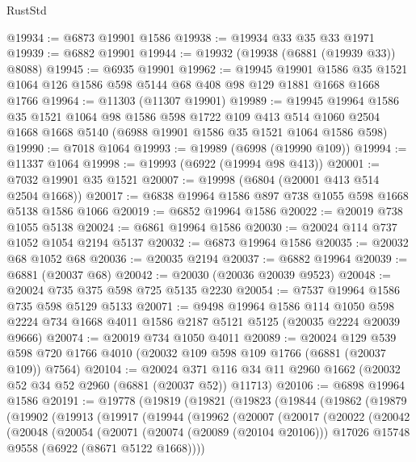 \begin{lexlean}{RustStd}
\begin{coremodule}
@19934 := @6873 @19901 @1586
@19938 := @19934 @33 @35 @33 @1971
@19939 := @6882 @19901
@19944 := @19932 (@19938 (@6881 (@19939 @33)) @8088)
@19945 := @6935 @19901
@19962 := @19945
    @19901
    @1586
    @35
    @1521
    @1064
    @126
    @1586
    @598
    @5144
    @68
    @408
    @98
    @129
    @1881
    @1668
    @1668
    @1766
@19964 := @11303 (@11307 @19901)
@19989 := @19945
    @19964
    @1586
    @35
    @1521
    @1064
    @98
    @1586
    @598
    @1722
    @109
    @413
    @514
    @1060
    @2504
    @1668
    @1668
    @5140
    (@6988 @19901 @1586 @35 @1521 @1064 @1586 @598)
@19990 := @7018 @1064
@19993 := @19989 (@6998 (@19990 @109))
@19994 := @11337 @1064
@19998 := @19993 (@6922 (@19994 @98 @413))
@20001 := @7032 @19901 @35 @1521
@20007 := @19998 (@6804 (@20001 @413 @514 @2504 @1668))
@20017 := @6838 @19964 @1586 @897 @738 @1055 @598 @1668 @5138 @1586 @1066
@20019 := @6852 @19964 @1586
@20022 := @20019 @738 @1055 @5138
@20024 := @6861 @19964 @1586
@20030 := @20024 @114 @737 @1052 @1054 @2194 @5137
@20032 := @6873 @19964 @1586
@20035 := @20032 @68 @1052 @68
@20036 := @20035 @2194
@20037 := @6882 @19964
@20039 := @6881 (@20037 @68)
@20042 := @20030 (@20036 @20039 @9523)
@20048 := @20024 @735 @375 @598 @725 @5135 @2230
@20054 := @7537 @19964 @1586 @735 @598 @5129 @5133
@20071 := @9498
    @19964
    @1586
    @114
    @1050
    @598
    @2224
    @734
    @1668
    @4011
    @1586
    @2187
    @5121
    @5125
    (@20035 @2224 @20039 @9666)
@20074 := @20019 @734 @1050 @4011
@20089 := @20024
    @129
    @539
    @598
    @720
    @1766
    @4010
    (@20032 @109 @598 @109 @1766 (@6881 (@20037 @109)) @7564)
@20104 := @20024
    @371
    @116
    @34
    @11
    @2960
    @1662
    (@20032 @52 @34 @52 @2960 (@6881 (@20037 @52)) @11713)
@20106 := @6898 @19964 @1586
@20191 := @19778
    (@19819
      (@19821
        (@19823
          (@19844
            (@19862
              (@19879
                (@19902
                  (@19913
                    (@19917
                      (@19944
                        (@19962
                          (@20007
                            (@20017
                              (@20022
                                (@20042
                                  (@20048
                                    (@20054
                                      (@20071
                                        (@20074 (@20089 (@20104 @20106)))
                                        @17026
                                        @15748
                                        @9558
                                        (@6922 (@8671 @5122 @1668))))

\end{coremodule}
\end{lexlean}
